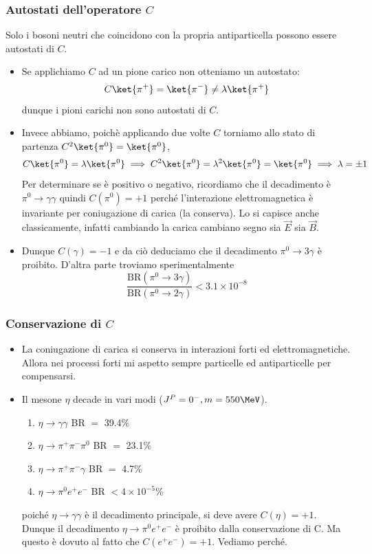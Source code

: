 \subsubsection{Autostati dell'operatore $C$}
Solo i bosoni neutri che coincidono con la propria antiparticella possono essere autostati di $C$.
\begin{itemize}
\item Se applichiamo $C$ ad un pione carico non otteniamo un autostato:
\begin{equation*}
C\ket{\pi^+}=\ket{\pi^-}\neq\lambda\ket{\pi^+}
\end{equation*}
dunque i pioni carichi non sono autostati di $C$. 
\item Invece abbiamo, poichè applicando due volte $C$ torniamo allo stato di partenza $C^2\ket{\pi^0}=\ket{\pi^0}$,
\begin{equation*}
C\ket{\pi^0}=\lambda\ket{\pi^0}\implies C^2\ket{\pi^0}=\lambda^2\ket{\pi^0}=\ket{\pi^0}\implies \lambda=\pm 1
\end{equation*}
Per determinare se è positivo o negativo, ricordiamo che il decadimento è $\pi^0\to\gamma\gamma$ quindi $C(\pi^0)=+1$ perché l'interazione elettromagnetica è invariante per coniugazione di carica (la conserva). Lo si capisce anche classicamente, infatti cambiando la carica cambiano segno sia $\vec E$ sia $\vec B$. 
\item Dunque $C(\gamma)=-1$ e da ciò deduciamo che il decadimento $\pi^0\to3\gamma$ è proibito. D'altra parte troviamo sperimentalmente
\begin{equation*}
\frac{\text{BR}(\pi^0\to3\gamma)}{\text{BR}(\pi^0\to2\gamma)}<3.1\times10^{-8}
\end{equation*}
\end{itemize}
\subsubsection{Conservazione di $C$}
\begin{itemize}
\item La coniugazione di carica si conserva in interazioni forti ed elettromagnetiche. Allora nei processi forti mi aspetto sempre particelle ed antiparticelle per compensarsi.
\item Il mesone $\eta$ decade in vari modi ($J^P=0^-, m=550\MeV$).
\begin{enumerate}
    \item $\eta\to\gamma\gamma$ BR $=$ 39.4\%
    \item $\eta\to\pi^+\pi^-\pi^0$ BR $=$ 23.1\%
    \item $\eta\to\pi^+\pi^-\gamma$ BR $=$ 4.7\%
    \item $\eta\to\pi^0e^+e^-$ BR $<4\times10^{-5}$\%
\end{enumerate} 
poiché $\eta\to\gamma\gamma$ è il decadimento principale, si deve avere $C(\eta)=+1$. Dunque il decadimento $\eta\to\pi^0e^+e^-$ è proibito dalla conservazione di C. Ma questo è dovuto al fatto che $C(e^+e^-)=+1$. Vediamo perché.
\end{itemize}
